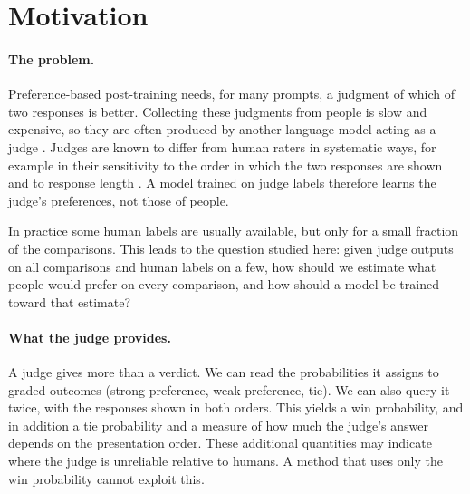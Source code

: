 \section{Motivation}
\label{sec:motivation}

\paragraph{The problem.}
Preference-based post-training needs, for many prompts, a judgment of which of two responses is
better. Collecting these judgments from people is slow and expensive, so they are often produced by
another language model acting as a judge
\citep{bai2022constitutional,zheng2023judging,lee2024rlaif}. Judges are known to differ from human
raters in systematic ways, for example in their sensitivity to the order in which the two responses
are shown and to response length \citep{zheng2023judging}. A model trained on judge labels
therefore learns the judge's preferences, not those of people.

In practice some human labels are usually available, but only for a small fraction of the
comparisons. This leads to the question studied here: given judge outputs on all comparisons and
human labels on a few, how should we estimate what people would prefer on every comparison, and
how should a model be trained toward that estimate?

\paragraph{What the judge provides.}
A judge gives more than a verdict. We can read the probabilities it assigns to graded outcomes
(strong preference, weak preference, tie). We can also query it twice, with the responses shown in
both orders. This yields a win probability, and in addition a tie probability and a measure of how
much the judge's answer depends on the presentation order. These additional quantities may
indicate where the judge is unreliable relative to humans. A method that uses only the win
probability cannot exploit this.

